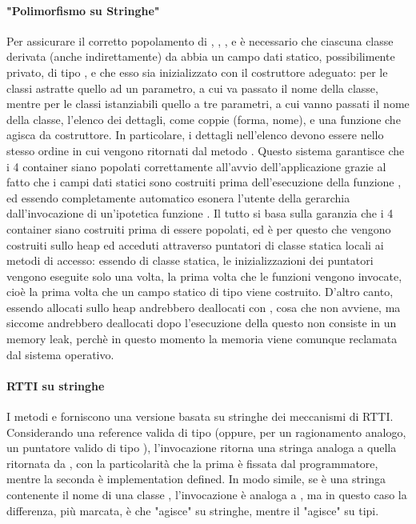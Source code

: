 \paragraph{"Polimorfismo su Stringhe"} %
\label{par:_polimorfismo_su_stringhe_}
Per assicurare il corretto popolamento di , , , e  è necessario che ciascuna classe derivata (anche indirettamente) da  abbia un campo dati statico, possibilimente privato, di tipo , e che esso sia inizializzato con il costruttore adeguato: per le classi astratte quello ad un parametro, a cui va passato il nome della classe, mentre per le classi istanziabili quello a tre parametri, a cui vanno passati il nome della classe, l'elenco dei dettagli, come coppie (forma, nome), e una funzione che agisca da costruttore. In particolare, i dettagli nell'elenco devono essere nello stesso ordine in cui vengono ritornati dal metodo . Questo sistema garantisce che i 4 container siano popolati correttamente all'avvio dell'applicazione grazie al fatto che i campi dati statici sono costruiti prima dell'esecuzione della funzione , ed essendo completamente automatico esonera l'utente della gerarchia dall'invocazione di un'ipotetica funzione . Il tutto si basa sulla garanzia che i 4 container siano costruiti prima di essere popolati, ed è per questo che vengono costruiti sullo heap ed acceduti attraverso puntatori di classe statica locali ai metodi di accesso: essendo di classe statica, le inizializzazioni dei puntatori vengono eseguite solo una volta, la prima volta che le funzioni vengono invocate, cioè la prima volta che un campo statico di tipo  viene costruito. D'altro canto, essendo allocati sullo heap andrebbero deallocati con , cosa che non avviene, ma siccome andrebbero deallocati dopo l'esecuzione della  questo non consiste in un memory leak, perchè in questo momento la memoria viene comunque reclamata dal sistema operativo. 
\paragraph{RTTI su stringhe} %
\label{par:rtti_su_stringhe}
I metodi  e  forniscono una versione basata su stringhe dei meccanismi di RTTI. Considerando una reference valida  di tipo  (oppure, per un ragionamento analogo, un puntatore valido di tipo ), l'invocazione  ritorna una stringa analoga a quella ritornata da , con la particolarità che la prima è fissata dal programmatore, mentre la seconda è implementation defined. In modo simile, se  è una stringa contenente il nome di una classe , l'invocazione  è analoga a , ma in questo caso la differenza, più marcata, è che  "agisce" su stringhe, mentre il  "agisce" su tipi.
